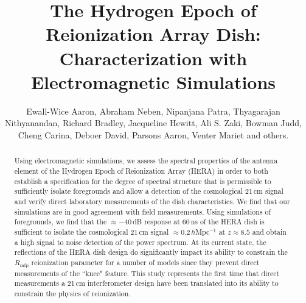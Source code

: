 \documentclass[onecolumn]{emulateapj}
\begin{document}
\title{The Hydrogen Epoch of Reionization Array Dish: Characterization with Electromagnetic Simulations}
\author{
Ewall-Wice Aaron,
Abraham Neben,
Nipanjana Patra,
Thyagarajan Nithyanandan,
Richard Bradley,
Jacqueline Hewitt,
Ali S. Zaki,
Bowman Judd,
Cheng Carina,
Deboer David,
Parsons Aaron,
Venter Mariet
and others.
}

\begin{abstract}
Using electromagnetic simulations, we assess the spectral properties of the antenna element of the Hydrogen Epoch of Reionization Array (HERA) in order to both establish a specification for the degree of spectral structure that is permissible to sufficiently isolate foregrounds and allow a detection of the cosmological 21\,cm signal and verify direct laboratory measurements of the dish characteristics. We find that our simulations are in good agreement with field measurements. Using simulations of foregrounds, we find that the $\approx -40$\,dB response at 60\,ns of the HERA dish is sufficient to isolate the cosmological 21\,cm signal $\approx 0.2$\,$h$Mpc$^{-1}$ at $z\approx 8.5$ and obtain a high signal to noise detection of the power spectrum. At its current state, the reflections of the HERA dish design do significantly impact its ability to constrain the $R_\text{mfp}$ reionization parameter for a number of models since they prevent direct measurements of the ``knee" feature. This study represents the first time that direct measurements a 21\,cm interferometer design have been translated into its ability to constrain the physics of reionization. 
\end{abstract}
\end{document}

